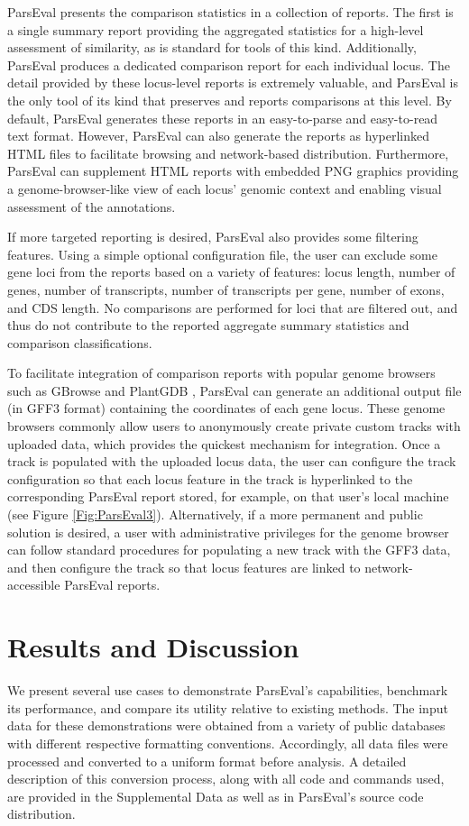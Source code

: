 ParsEval presents the comparison statistics in a collection of reports.
The first is a single summary report providing the aggregated statistics for a high-level assessment of similarity, as is standard for tools of this kind.
Additionally, ParsEval produces a dedicated comparison report for each individual locus.
The detail provided by these locus-level reports is extremely valuable, and ParsEval is the only tool of its kind that preserves and reports comparisons at this level.
By default, ParsEval generates these reports in an easy-to-parse and easy-to-read text format.
However, ParsEval can also generate the reports as hyperlinked HTML files to facilitate browsing and network-based distribution.
Furthermore, ParsEval can supplement HTML reports with embedded PNG graphics providing a genome-browser-like view of each locus' genomic context and enabling visual assessment of the annotations.

If more targeted reporting is desired, ParsEval also provides some filtering features.
Using a simple optional configuration file, the user can exclude some gene loci from the reports based on a variety of features: locus length, number of genes, number of transcripts, number of transcripts per gene, number of exons, and CDS length.
No comparisons are performed for loci that are filtered out, and thus do not contribute to the reported aggregate summary statistics and comparison classifications.

To facilitate integration of comparison reports with popular genome browsers such as GBrowse  \citep{GBrowse} and PlantGDB  \citep{Duvick}, ParsEval can generate an additional output file (in GFF3 format) containing the coordinates of each gene locus.
These genome browsers commonly allow users to anonymously create private custom tracks with uploaded data, which provides the quickest mechanism for integration.
Once a track is populated with the uploaded locus data, the user can configure the track configuration so that each locus feature in the track is hyperlinked to the corresponding ParsEval report stored, for example, on that user's local machine (see Figure \ref{Fig:ParsEval3}).
Alternatively, if a more permanent and public solution is desired, a user with administrative privileges for the genome browser can follow standard procedures for populating a new track with the GFF3 data, and then configure the track so that locus features are linked to network-accessible ParsEval reports.


\section{Results and Discussion}
We present several use cases to demonstrate ParsEval's capabilities, benchmark its performance, and compare its utility relative to existing methods.
The input data for these demonstrations were obtained from a variety of public databases with different respective formatting conventions.
Accordingly, all data files were processed and converted to a uniform format before analysis.
A detailed description of this conversion process, along with all code and commands used, are provided in the Supplemental Data as well as in ParsEval's source code distribution.

